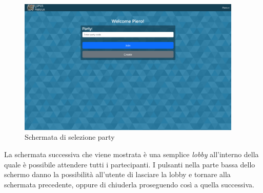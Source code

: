 \begin{figure}[H]
\begin{minipage}{0.25\textwidth}
    \end{minipage}\hfill
    \begin{minipage}{0.75\textwidth}
        \centering
        \includegraphics[width=0.95\textwidth]{img/screen/desktop/party_desktop.png}
    \end{minipage}
    \caption{Schermata di selezione party}
    \label{fig:party_ui}
\end{figure}

La schermata successiva che viene mostrata è una semplice \emph{lobby} all'interno della quale è possibile attendere tutti i partecipanti. I pulsanti nella parte bassa dello schermo danno la possibilità all'utente di lasciare la lobby e tornare alla schermata precedente, oppure di chiuderla proseguendo così a quella successiva.

